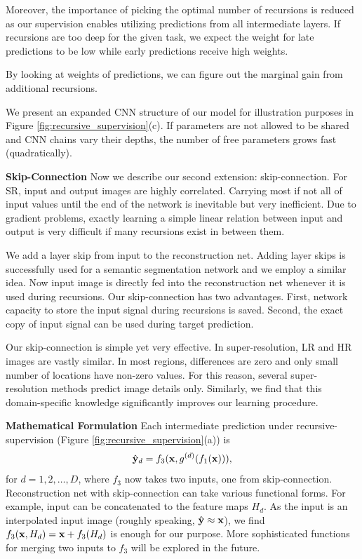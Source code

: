 \documentclass[10pt,twocolumn,letterpaper]{article}
\begin{document}
Moreover, the importance of picking the optimal number of recursions is reduced as our supervision enables utilizing predictions from all intermediate layers. If recursions are too deep for the given task, we expect the weight for late predictions to be low while early predictions receive high weights. 


By looking at weights of predictions, we can figure out the marginal gain from additional recursions. 

We present an expanded CNN structure of our model for illustration purposes in Figure \ref{fig:recursive_supervision}(c). If parameters are not allowed to be shared and CNN chains vary their depths, the number of free parameters grows fast (quadratically).

\textbf{Skip-Connection} Now we describe our second extension: skip-connection. For SR, input and output images are highly correlated. Carrying most if not all of input values until the end of the network is inevitable but very inefficient. Due to gradient problems, exactly learning a simple linear relation between input and output is very difficult if many recursions exist in between them.  

We add a layer skip \cite{bishop2006pattern} from input to the reconstruction net. Adding layer skips is successfully used for a semantic segmentation network \cite{long2014fully} and we employ a similar idea. Now input image is directly fed into the reconstruction net whenever it is used during recursions. Our skip-connection has two advantages. First, network capacity to store the input signal during recursions is saved. Second, the exact copy of input signal can be used during target prediction. 

Our skip-connection is simple yet very effective. In super-resolution, LR and HR images are vastly similar. In most regions, differences are zero and only small number of locations have non-zero values. For this reason, several super-resolution methods \cite{Timofte2013, Timofte, bevilacqua2012,bevilacqua2013super} predict image details only. Similarly, we find that this domain-specific knowledge significantly improves our learning procedure. 

\textbf{Mathematical Formulation} Each intermediate prediction under recursive-supervision (Figure \ref{fig:recursive_supervision}(a)) is 
\begin{equation}
\hat{{\bf y}}_{d} = f_3({\bf x}, g^{(d)}(f_1({\bf x}))),
\end{equation}
for $d=1,2,\dots,D$, where $f_3$ now takes two inputs, one from skip-connection. Reconstruction net with skip-connection can take various functional forms. For example, input can be concatenated to the feature maps $H_d$. As the input is an interpolated input image (roughly speaking, $\hat{\bf y} \approx {\bf x}$), we find $f_3({\bf x}, H_d) = {\bf x} + f_3(H_d)$ is enough for our purpose. More sophisticated functions for merging two inputs to $f_3$ will be explored in the future. 
\end{document}
